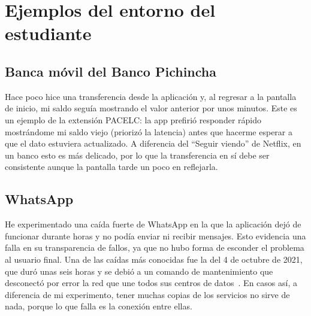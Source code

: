 \section{Ejemplos del entorno del estudiante}

\subsection{Banca móvil del Banco Pichincha}

Hace poco hice una transferencia desde la aplicación y, al regresar a la pantalla de inicio, mi saldo seguía mostrando el valor anterior por unos minutos. Este es un ejemplo de la extensión PACELC: la app prefirió responder rápido mostrándome mi saldo viejo (priorizó la latencia) antes que hacerme esperar a que el dato estuviera actualizado. A diferencia del \enquote{Seguir viendo} de Netflix, en un banco esto es más delicado, por lo que la transferencia en sí debe ser consistente aunque la pantalla tarde un poco en reflejarla.

\subsection{WhatsApp}

He experimentado una caída fuerte de WhatsApp en la que la aplicación dejó de funcionar durante horas y no podía enviar ni recibir mensajes. Esto evidencia una falla en su transparencia de fallos, ya que no hubo forma de esconder el problema al usuario final. Una de las caídas más conocidas fue la del 4 de octubre de 2021, que duró unas seis horas y se debió a un comando de mantenimiento que desconectó por error la red que une todos sus centros de datos~\cite{Meta_Outage2021}. En casos así, a diferencia de mi experimento, tener muchas copias de los servicios no sirve de nada, porque lo que falla es la conexión entre ellas.
